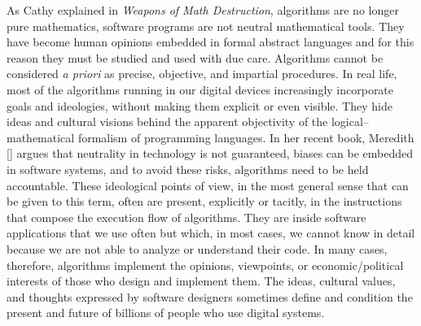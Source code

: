 As Cathy \citet{chap:7:ONeil:2016} explained in \textit{Weapons of Math Destruction}, algorithms are no longer pure mathematics, software programs are not neutral mathematical tools. They have become human opinions embedded in formal abstract languages and for this reason they must be studied and used with due care. Algorithms \hbox{cannot} be considered \textit{a priori} as precise, objective, and impartial procedures. In real life, most of the algorithms running in our digital devices increasingly incorporate goals and ideologies, without making them explicit or even visible. They hide ideas and cultural visions behind the apparent objectivity of the logical--mathematical formalism of programming languages. In her recent book, Meredith \citeauthor{chap:7:Broussard:2023} \mbox{[\citeyear{chap:7:Broussard:2023}]} argues that neutrality in technology is not guaranteed, biases can be embedded in software systems, and to avoid these risks, algorithms need to be held accountable. These ideological points of view, in the most general sense that can be given to this term, often are present, explicitly or tacitly, in the instructions that compose the execution flow of algorithms. They are inside software applications that we use often but which, in most cases, we cannot know in detail because we are not able to analyze or understand their code. In many cases, therefore, algorithms implement the opinions, viewpoints, or economic/political interests of those who design and implement them. The ideas, cultural values, and thoughts expressed by software designers sometimes define and condition the present and future of billions of people who use digital systems.

